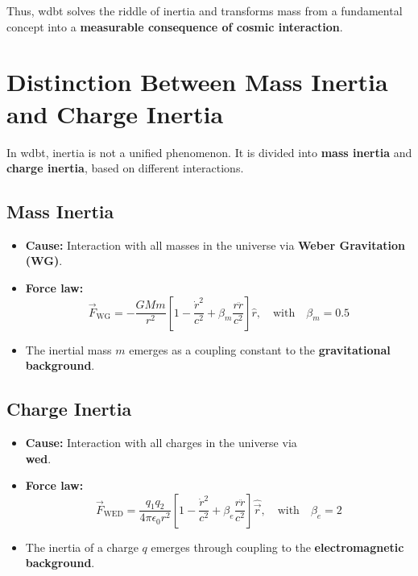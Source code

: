 Thus, \gls{wdbt} solves the riddle of inertia and transforms mass from a fundamental concept into a \textbf{measurable consequence of cosmic interaction}.

\section{Distinction Between Mass Inertia and Charge Inertia}

In \gls{wdbt}, inertia is not a unified phenomenon. It is divided into \textbf{mass inertia} and \textbf{charge inertia}, based on different interactions.

\subsection{Mass Inertia}
\begin{itemize}
    \item \textbf{Cause:} Interaction with all masses in the universe via \textbf{Weber Gravitation (WG)}.
    \item \textbf{Force law:}
        \[
        \vec{F}_{\text{WG}} = -\frac{G M m}{r^2} \left[ 1 - \frac{\dot{r}^2}{c^2} + \beta_m \frac{r \ddot{r}}{c^2} \right] \hat{r}, \quad \text{with} \quad \beta_m = 0.5
        \]
    \item The inertial mass $m$ emerges as a coupling constant to the \textbf{gravitational background}.
\end{itemize}

\subsection{Charge Inertia}
\begin{itemize}
    \item \textbf{Cause:} Interaction with all charges in the universe via\\\textbf{\gls{wed}}.
    \item \textbf{Force law:}
        \begin{equation}
        \vec{F}_{\text{WED}} = \frac{q_1 q_2}{4\pi\epsilon_0 r^2} \left[ 1 - \frac{\dot{r}^2}{c^2} + \beta_e \frac{r \ddot{r}}{c^2} \right] \hat{\vec{r}}, \quad \text{with} \quad \beta_e = 2            
        \end{equation}
    \item The inertia of a charge $q$ emerges through coupling to the \textbf{electromagnetic background}.
\end{itemize}

